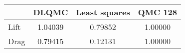 \begin{tabular}{|l|c|c|c|}
\hline
 &DLQMC&Least squares&QMC 128\\ 
\hline

Lift & 1.04039 & 0.79852 & 1.00000\\ 
\hline
Drag & 0.79415 & 0.12131 & 1.00000\\ 
\hline
\end{tabular}

